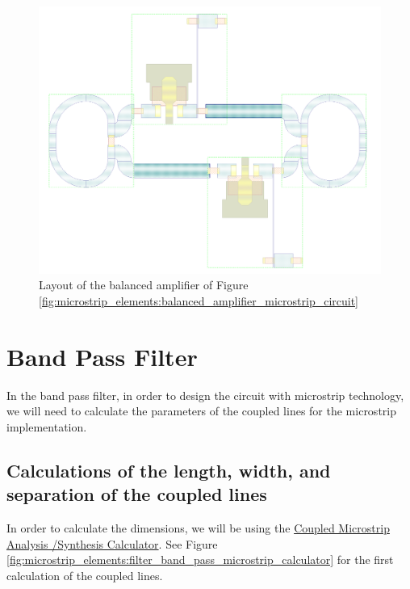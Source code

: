 \documentclass[12pt]{report} %
\let\oldsection\section
\renewcommand\section{\clearpage\oldsection}
\begin{document}
\begin{figure}[htbp]
    \centering
    \includegraphics[width=1\linewidth]{images//microstrip_elements/balanced_amplifier_microstrip_layout.png}
    \caption{Layout of the balanced amplifier of Figure \ref{fig:microstrip_elements:balanced_amplifier_microstrip_circuit}}
    \label{fig:microstrip_elements:balanced_amplifier_microstrip_layout}
\end{figure}

\section{Band Pass Filter}

In the band pass filter, in order to design the circuit with microstrip technology, we will need to calculate the parameters of the coupled lines for the microstrip implementation.

\subsection{Calculations of the length, width, and separation of the coupled lines}

In order to calculate the dimensions, we will be using the \href{https://wcalc.sourceforge.net/cgi-bin/coupled_microstrip.cgi}{Coupled Microstrip Analysis /Synthesis Calculator}. See Figure \ref{fig:microstrip_elements:filter_band_pass_microstrip_calculator} for the first calculation of the coupled lines.
\end{document}
